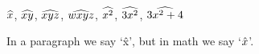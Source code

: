 \def\Widehat{\mathaccent"0362 }%
\def\Hat{\mathaccent"705E }
$\Widehat x$, $\Widehat {xy}$, $\Widehat {xyz}$, $\Widehat {wxyz}$,
$\Widehat {x^2}$, $\Widehat {3x^2}$, $\Widehat {3x^2+4}$\par
In a paragraph we say `\^x', but in math we say `$\Hat x$'.
\bye
